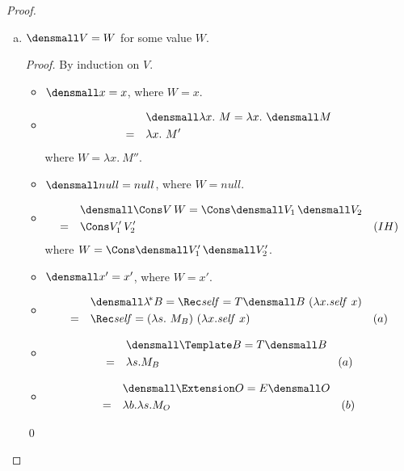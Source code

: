 \begin{proof}
\begin{enumerate}[(a)]
\begin{proof}
\begin{itemize}
        \begin{align*}
            & \quad E\den{x ~O} =  \lambda b. \lambda x. E\den{\lambda P. O'} ~ b ~ x\\
            =& \quad \lambda b. \lambda x. (\lambda b. \lambda s. \lambda x. M') ~ b ~ x & (IH) \\
            =& \quad \lambda b. \lambda x. (\lambda x. M'\subst{s}{x}) & (\beta) \\
            =& \quad \lambda b. \lambda s. (\lambda x. M'\subst{s}{x})\subst{x}{s} & (\alpha)
        \end{align*}
    \end{itemize}
    \qed
\end{proof}
\item $\den{V} = W$ for some value $W$.
\begin{proof}
    By induction on $V$.
    \begin{itemize}
        \item $\den{x} = x$, where $W=x$.
        \item \begin{align*}
            & \quad \den{\lambda x. ~M} = \lambda x. ~\den{M} \\
            =& \quad \lambda x. ~M'
        \end{align*}
        where $W = \lambda x. ~M''$.
        \item $\den{null} = null$, where $W=null$.
        \item \begin{align*}
            & \quad \den{\Cons V \, W} = \Cons \den{V_1} \, \den{V_2} \\
            =& \quad \Cons V_1' \, V_2' & (IH)
        \end{align*}
        where $W = \Cons \den{V_1'} \, \den{V_2'}$.
        \item $\den{x'} = x'$, where $W=x'$.
        \item \begin{align*}
            & \quad \den{\lamstar B} = \Rec \mathit{self} = T\den{B} ~ (\lambda x. \mathit{self} ~ x) \\
            =& \quad \Rec \mathit{self} = (\lambda s. ~M_B) ~ (\lambda x. \mathit{self} ~ x) & (a)
        \end{align*}
        \item \begin{align*}
            & \quad \den{\Template B} = T\den{B} \\
            =& \quad \lambda s. M_B& (a)
        \end{align*}
        \item \begin{align*}
            & \quad \den{\Extension O} = E\den{O} \\
            =& \quad \lambda b. \lambda s. M_O& (b)
        \end{align*}
    \end{itemize}
    \qed
\end{proof}
\end{enumerate}

\end{proof}

